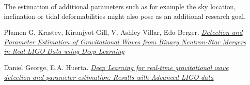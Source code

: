 \documentclass[12pt]{article}
\begin{document}
The estimation of additional parameters such as for example the sky location,
inclination or tidal deformabilities might also pose as an additional research
goal.

\begin{thebibliography}{9}
Plamen G. Krastev, Kiranjyot Gill, V. Ashley Villar, Edo Berger.
\href{https://arxiv.org/abs/2012.13101}
{\textit{Detection and Parameter Estimation of Gravitational Waves from Binary
Neutron-Star Mergers in Real LIGO Data using Deep Learning}}

Daniel George, E.A. Huerta.
\href{https://www.sciencedirect.com/science/article/pii/S0370269317310390}
{\textit{Deep Learning for real-time gravitational wave detection and parameter
estimation: Results with Advanced LIGO data}}
\end{thebibliography}
\end{document}
